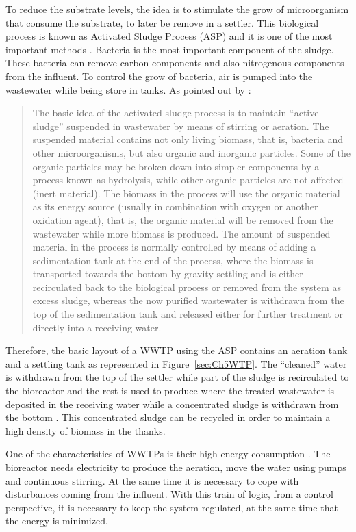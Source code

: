 To reduce the substrate levels, the idea is to stimulate the grow of microorganism that consume the substrate, to later be remove in a settler. This biological process is known as Activated Sludge Process (ASP) and it is one of the most important methods \citep{Henze1997}. Bacteria is the most important component of the sludge. These bacteria can remove carbon components and also nitrogenous components from the influent. To control the grow of bacteria, air is pumped into the wastewater while being store in tanks. As pointed out by \citet{Jeppsson1996}:
\begin{quote}
	The basic idea of the activated sludge process is to maintain ``active sludge'' suspended in wastewater by means of stirring or aeration. The suspended material contains not only living biomass, that is, bacteria and other microorganisms, but also organic and inorganic particles. Some of the organic particles may be broken down into simpler components by a process known as hydrolysis, while other organic particles are not affected (inert material). The biomass in the process will use the organic material as its energy source (usually in combination with oxygen or another oxidation agent), that is, the organic material will be removed from the wastewater while more biomass is produced. The amount of suspended material in the process is normally controlled by means of adding a sedimentation tank at the end of the process, where the biomass is transported towards the bottom by gravity settling and is either recirculated back to the biological process or removed from the system as excess sludge, whereas the now purified wastewater is withdrawn from the top of the sedimentation tank and released either for further treatment or directly into a receiving water.
\end{quote}
%

Therefore, the basic layout of a WWTP using the ASP contains an aeration tank and a settling tank as represented in Figure~\ref{sec:Ch5WTP}. The ``cleaned'' water is withdrawn from the top of the settler while part of the sludge is recirculated to the bioreactor and the rest is used to produce where the treated wastewater is deposited in the receiving water while a concentrated sludge is withdrawn from the bottom \citep{Henze1997}. This concentrated sludge can be recycled in order to maintain a high density of biomass in the thanks.

One of the characteristics of WWTPs is their high energy consumption \citep{Longo2016}. The bioreactor needs electricity to produce the aeration, move the water using pumps and continuous stirring. At the same time it is necessary to cope with disturbances coming from the influent. With this train of logic, from a control perspective, it is necessary to keep the system regulated, at the same time that the energy is minimized.

